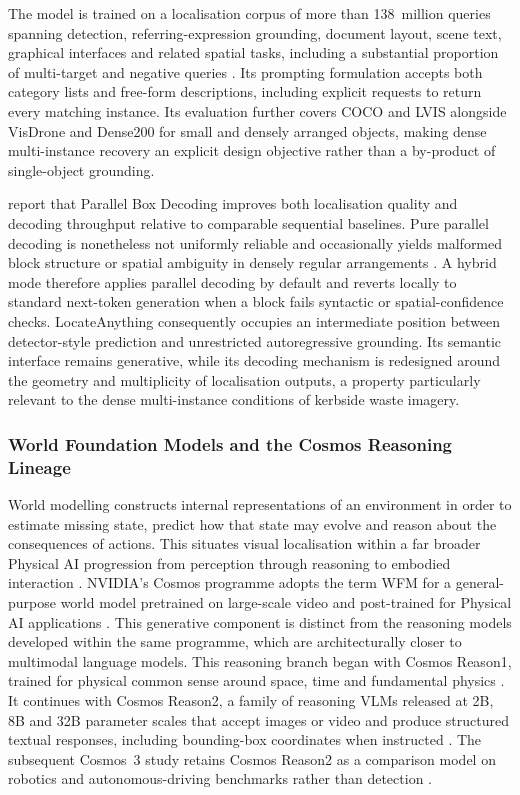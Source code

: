 The model is trained on a localisation corpus of more than 138~million queries spanning detection, referring-expression grounding, document layout, scene text, graphical interfaces and related spatial tasks, including a substantial proportion of multi-target and negative queries \cite{nvidia2026locateanything}. Its prompting formulation accepts both category lists and free-form descriptions, including explicit requests to return every matching instance. Its evaluation further covers \gls{COCO} and LVIS alongside VisDrone and Dense200 for small and densely arranged objects, making dense multi-instance recovery an explicit design objective rather than a by-product of single-object grounding.

\citeauthor{nvidia2026locateanything} report that Parallel Box Decoding improves both localisation quality and decoding throughput relative to comparable sequential baselines. Pure parallel decoding is nonetheless not uniformly reliable and occasionally yields malformed block structure or spatial ambiguity in densely regular arrangements \cite{nvidia2026locateanything}. A hybrid mode therefore applies parallel decoding by default and reverts locally to standard next-token generation when a block fails syntactic or spatial-confidence checks. LocateAnything consequently occupies an intermediate position between detector-style prediction and unrestricted autoregressive grounding. Its semantic interface remains generative, while its decoding mechanism is redesigned around the geometry and multiplicity of localisation outputs, a property particularly relevant to the dense multi-instance conditions of kerbside waste imagery.

\subsubsection{World Foundation Models and the Cosmos Reasoning Lineage}
\label{sec:bg-cosmos}
World modelling constructs internal representations of an environment in order to estimate missing state, predict how that state may evolve and reason about the consequences of actions. This situates visual localisation within a far broader Physical \gls{AI} progression from perception through reasoning to embodied interaction \cite{guan2024worldmodels,xiang2026physicalai}. NVIDIA's Cosmos programme adopts the term \gls{WFM} for a general-purpose world model pretrained on large-scale video and post-trained for Physical \gls{AI} applications \cite{nvidia2025cosmosplatform}. This generative component is distinct from the reasoning models developed within the same programme, which are architecturally closer to multimodal language models. This reasoning branch began with Cosmos Reason1, trained for physical common sense around space, time and fundamental physics \cite{nvidia2025cosmosreason1}. It continues with Cosmos Reason2, a family of reasoning \glspl{VLM} released at 2B, 8B and 32B parameter scales that accept images or video and produce structured textual responses, including bounding-box coordinates when instructed \cite{nvidia2025cosmosreason2}. The subsequent Cosmos~3 study retains Cosmos Reason2 as a comparison model on robotics and autonomous-driving benchmarks rather than detection \cite{nvidia2026cosmos3}.

